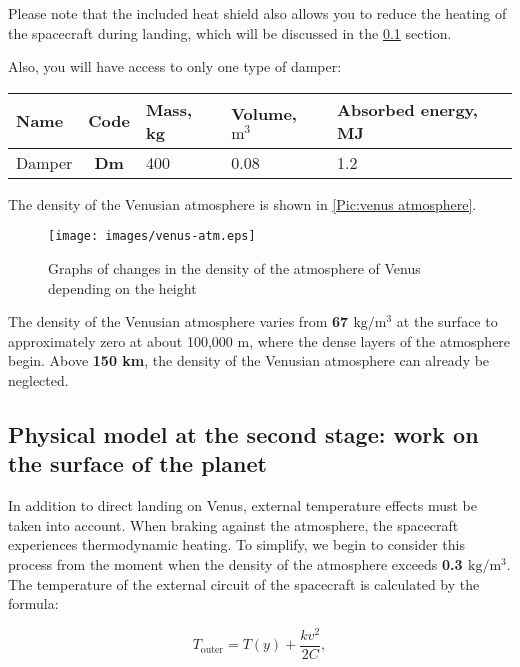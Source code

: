 \documentclass[12pt,a4paper]{article}
\begin{document}
Please note that the included heat shield also allows you to reduce the heating of the spacecraft during landing, which will be discussed in the \ref{Sec:thermal} section.

Also, you will have access to only one type of damper:

\begin{center}
\begin{tabular}{ |p{5.5cm}|c|p{1.5cm}|p{1.5cm}|p{4cm}| }
  \hline
  \textbf{Name} & \textbf{Code} & \textbf{Mass, kg} & \textbf{Volume, $\text{m}^3$} & \textbf{Absorbed energy, MJ}\\
   \hline
   Damper & \textbf{Dm} & 400 & 0.08 & 1.2\\
  \hline
\end{tabular}
\end{center}

The density of the Venusian atmosphere is shown in \ref{Pic:venus atmosphere}.

\begin{figure}[tbh]
  \begin{center}
    \texttt{[image: images/venus-atm.eps]}
    \caption{Graphs of changes in the density of the atmosphere of Venus depending on the height}
    \label{Pic:venus_atmosphere}
  \end{center}
\end{figure}

The density of the Venusian atmosphere varies from \textbf{67 $\text{kg}/\text{m}^3$} at the surface to approximately zero at about 100,000 m, where the dense layers of the atmosphere begin. Above \textbf{150 km}, the density of the Venusian atmosphere can already be neglected.

\subsection{Physical model at the second stage: work on the surface of the planet} \label{Sec:thermal}

In addition to direct landing on Venus, external temperature effects must be taken into account. When braking against the atmosphere, the spacecraft experiences thermodynamic heating. To simplify, we begin to consider this process from the moment when the density of the atmosphere exceeds \textbf{0.3 $\text{kg}/\text{m}^3$}. The temperature of the external circuit of the spacecraft is calculated by the formula:

$$
T_{\text{outer}} = T(y) + \frac{k v^2}{2 C},
$$
\end{document}
